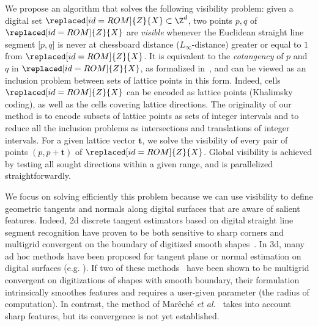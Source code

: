     We propose an algorithm that solves the following visibility
    problem: given a digital set $\replaced[id=ROM]{Z}{X} \subset \Z^d$, two points $p,q$ of
    $\replaced[id=ROM]{Z}{X}$ are \emph{visible} whenever the Euclidean straight line
    segment $\lbrack p,q \rbrack$ is never at chessboard distance
    ($L_\infty$-distance) greater or equal to $1$ from $\replaced[id=ROM]{Z}{X}$. It is
    equivalent to the \emph{cotangency} of $p$ and $q$ in $\replaced[id=ROM]{Z}{X}$, as
    formalized in~\cite{lachaud:2021-dgmm,lachaud:2022-jmiv}, and can
    be viewed as an inclusion problem between sets of lattice points
    in this form. Indeed, cells  $\replaced[id=ROM]{Z}{X}$ can be encoded as
    lattice points (Khalimsky coding), as well as the cells covering
    lattice directions. The originality of our method is to encode
    subsets of lattice points as sets of integer intervals and to
    reduce all the inclusion problems as intersections and
    translations of integer intervals. For a given lattice vector
    $\mathbf{t}$, we solve the visibility of every pair of points
    $(p,p+\mathbf{t})$ of $\replaced[id=ROM]{Z}{X}$. Global visibility is achieved by
    testing all sought directions within a given range, and is
    parallelized straightforwardly.

    We focus on solving efficiently this problem because we can use
    visibility to define geometric tangents and normals along digital
    surfaces that are aware of salient features. Indeed, 2d discrete
    tangent estimators based on digital straight line segment
    recognition have proven to be both sensitive to sharp corners and
    multigrid convergent on the boundary of digitized smooth
    shapes~\cite{feschet:1999-dgci,lachaud:2007-ivc,nguyen:2011-pr}.
    In 3d, many ad hoc methods have been proposed for tangent plane or
    normal estimation on digital surfaces
    (e.g. \cite{fourey:2009-cg,charrier:2011-iwcia,Cuel:2014-dgci,Lachaud:2017-lnm,mareche:2024-ispr}).
    If two of these methods~\cite{Cuel:2014-dgci,Lachaud:2017-lnm}
    have been shown to be multigrid convergent on digitizations of
    shapes with smooth boundary, their formulation intrinsically
    smoothes features and requires a user-given parameter (the radius
    of computation). In contrast, the method of
    Mar{\^e}ch{\'e} \emph{et al.}~\cite{mareche:2024-ispr} takes into
    account sharp features, but its convergence is not yet
    established.

